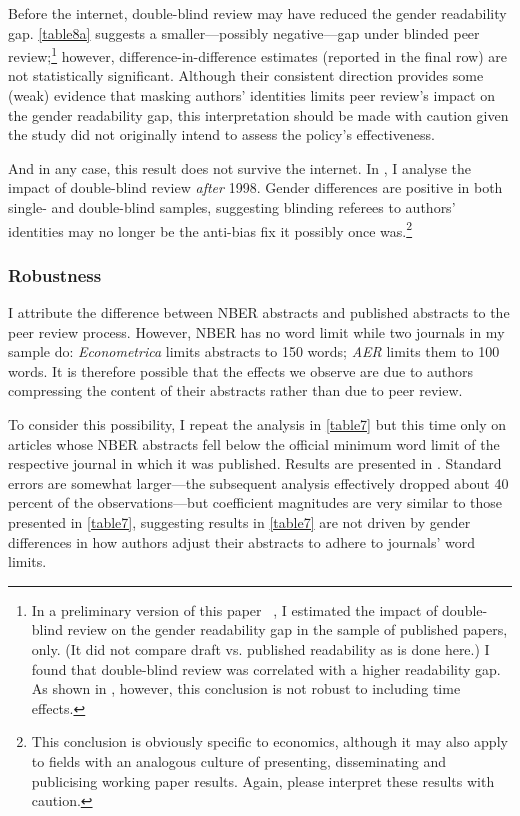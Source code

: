 Before the internet, double-blind review may have reduced the gender readability gap. \autoref{table8a} suggests a smaller---possibly negative---gap under blinded peer review;\footnote{In a preliminary version of this paper ~\citep{Hengel2015}, I estimated the impact of double-blind review on the gender readability gap in the sample of published papers, only. (It did not compare draft vs. published readability as is done here.) I found that double-blind review was correlated with a higher readability gap. As shown in , however, this conclusion is not robust to including time effects.} however, difference-in-difference estimates (reported in the final row) are not statistically significant. Although their consistent direction provides some (weak) evidence that masking authors' identities limits peer review's impact on the gender readability gap, this interpretation should be made with caution given the study did not originally intend to assess the policy's effectiveness.



And in any case, this result does not survive the internet. In , I analyse the impact of double-blind review \emph{after} 1998. Gender differences are positive in both single- and double-blind samples, suggesting blinding referees to authors' identities may no longer be the anti-bias fix it possibly once was.\footnote{This conclusion is obviously specific to economics, although it may also apply to fields with an analogous culture of presenting, disseminating and publicising working paper results. Again, please interpret these results with caution.} 

\subsubsection{Robustness}
\label{nberrobustness}

I attribute the difference between NBER abstracts and published abstracts to the peer review process. However, NBER has no word limit while two journals in my sample do: \emph{Econometrica} limits abstracts to 150 words; \emph{AER} limits them to 100 words. It is therefore possible that the effects we observe are due to authors compressing the content of their abstracts rather than due to peer review.

To consider this possibility, I repeat the analysis in \autoref{table7} but this time only on articles whose NBER abstracts fell below the official minimum word limit of the respective journal in which it was published. Results are presented in . Standard errors are somewhat larger---the subsequent analysis effectively dropped about 40 percent of the observations---but coefficient magnitudes are very similar to those presented in \autoref{table7}, suggesting results in \autoref{table7} are not driven by gender differences in how authors adjust their abstracts to adhere to journals' word limits.

